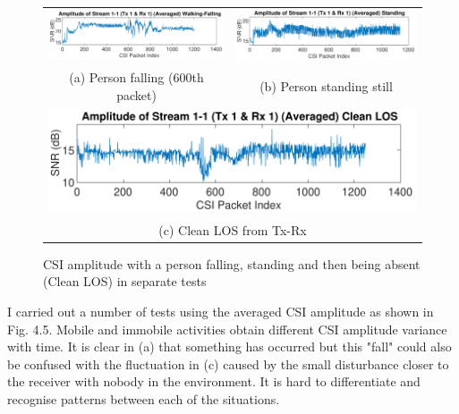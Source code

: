 \vspace{11pt}
\begin{figure}[H]
\centering
\begin{tabular}{cc}
  \includegraphics[scale = 0.5]{Figures/walkingFallingAveraged.pdf} &   \includegraphics[scale=0.5]{Figures/standingForAmplitude.pdf} \\
(a) Person falling (600th packet) & (b) Person standing still \\[6pt]
\multicolumn{2}{c}{\includegraphics[scale = 0.5]{Figures/cleanLOSForAmplitude.pdf} }\\
\multicolumn{2}{c}{(c) Clean LOS from Tx-Rx}
\end{tabular}
\caption{CSI amplitude with a person falling, standing and then being absent (Clean LOS) in separate tests}
\label{fig:diffamplitudes}%
\end{figure}
I carried out a number of tests using the averaged CSI amplitude as shown in Fig. 4.5. Mobile and immobile activities obtain different CSI amplitude variance with time. It is clear in (a) that something has occurred but this "fall" could also be confused with the fluctuation in (c) caused by the small disturbance closer to the receiver with nobody in the environment. It is hard to differentiate and recognise patterns between each of the situations. 
